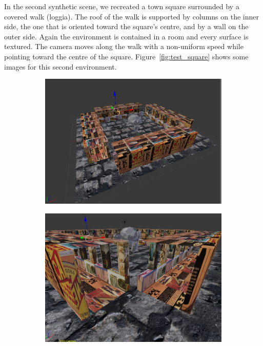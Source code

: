In the second synthetic scene, we recreated a town square surrounded by
a covered walk (loggia). The roof of the walk is supported by columns on the inner
side, the one that is oriented toward the square's centre, and by a wall on the
outer side.
Again the environment is contained in a room and every surface is textured.
The camera moves along the walk with a non-uniform speed while pointing toward
the centre of the square. Figure~\ref{fig:test_square} shows some images
for this second environment.
%
\begin{figure}
\centering
	\begin{subfigure}{0.4\textwidth}
		\centering
		\includegraphics[width=\textwidth]{img/square1}
	\end{subfigure}
	\begin{subfigure}{0.4\textwidth}
		\centering
		\includegraphics[width=\textwidth]{img/square2}

\end{subfigure}
\end{figure}
